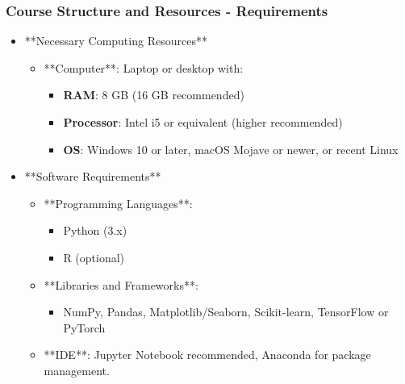 \documentclass[aspectratio=169]{beamer}
\begin{document}
\begin{frame}[fragile]
    \frametitle{Course Structure and Resources - Requirements}
    \begin{itemize}
        \item **Necessary Computing Resources**
        \begin{itemize}
            \item **Computer**: Laptop or desktop with:
                \begin{itemize}
                    \item \textbf{RAM}: 8 GB (16 GB recommended)
                    \item \textbf{Processor}: Intel i5 or equivalent (higher recommended)
                    \item \textbf{OS}: Windows 10 or later, macOS Mojave or newer, or recent Linux
                \end{itemize}
        \end{itemize}
        
        \item **Software Requirements**
        \begin{itemize}
            \item **Programming Languages**:
                \begin{itemize}
                    \item Python (3.x)
                    \item R (optional)
                \end{itemize}
            \item **Libraries and Frameworks**:
                \begin{itemize}
                    \item NumPy, Pandas, Matplotlib/Seaborn, Scikit-learn, TensorFlow or PyTorch
                \end{itemize}
            \item **IDE**: Jupyter Notebook recommended, Anaconda for package management.
        \end{itemize}
    \end{itemize}
\end{frame}
\end{document}
